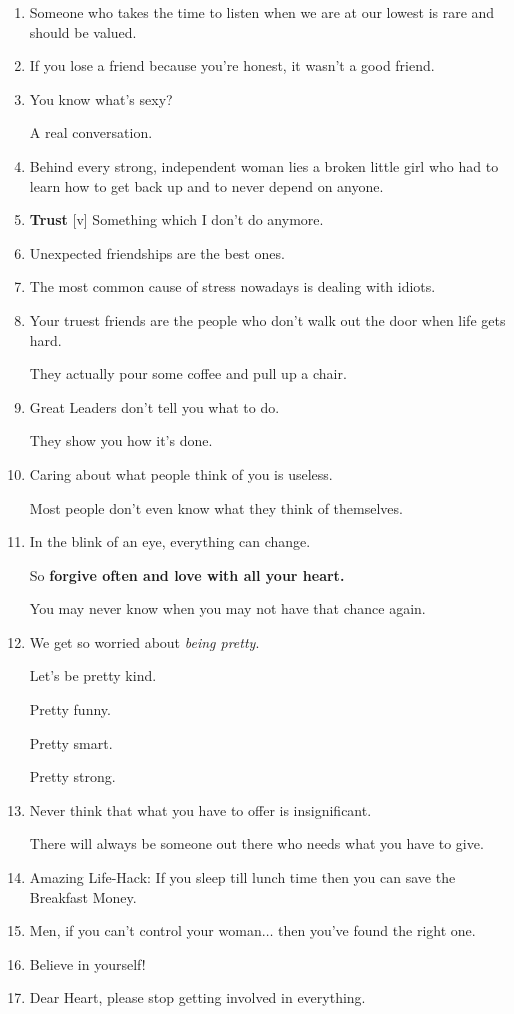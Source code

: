 \documentclass{article}
\numberwithin{equation}{section}
\begin{document}
\begin{enumerate}
    \textit{Because they know what it's like to feel \textbf{absolutely worthless} and they don't want anybody else to feel like that}.'' - Robin Williams (1951--2014)
    \item Someone who takes the time to listen when we are at our lowest is rare and should be valued.
    \item If you lose a friend because you're honest, it wasn't a good friend.
    \item You know what's sexy?
    
    A real conversation.
    \item Behind every strong, independent woman lies a broken little girl who had to learn how to get back up and to never depend on anyone.
    \item \textbf{Trust} [v] Something which I don't do anymore.
    \item Unexpected friendships are the best ones.
    \item The most common cause of stress nowadays is dealing with idiots.
    \item Your truest friends are the people who don't walk out the door when life gets hard.
    
    They actually pour some coffee and pull up a chair.
    \item Great Leaders don't tell you what to do.
    
    They show you how it's done.
    \item Caring about what people think of you is useless.
    
    Most people don't even know what they think of themselves.
    \item In the blink of an eye, everything can change.
    
    So \textbf{forgive often and love with all your heart.}
    
    You may never know when you may not have that chance again.
    \item We get so worried about \textit{being pretty}.
    
    Let's be pretty kind.
    
    Pretty funny.
    
    Pretty smart.
    
    Pretty strong.
    \item Never think that what you have to offer is insignificant.
    
    There will always be someone out there who needs what you have to give.
    \item Amazing Life-Hack: If you sleep till lunch time then you can save the Breakfast Money.
    \item Men, if you can't control your woman$\ldots$ then you've found the right one.
    \item Believe in yourself!
    \item Dear Heart, please stop getting involved in everything.
    

\end{enumerate}
\end{document}

